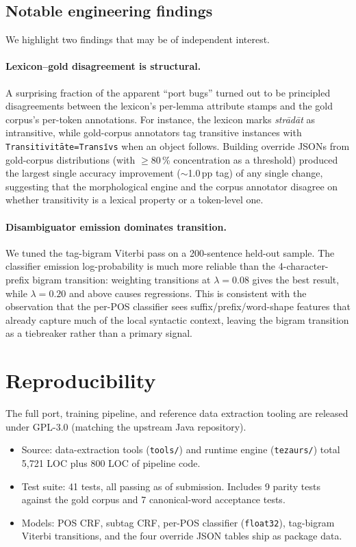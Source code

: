 \documentclass[11pt,a4paper]{article}
\begin{document}
\subsection{Notable engineering findings}

We highlight two findings that may be of independent interest.

\paragraph{Lexicon--gold disagreement is structural.} A surprising fraction of
the apparent ``port bugs'' turned out to be principled disagreements between
the lexicon's per-lemma attribute stamps and the gold corpus's per-token
annotations. For instance, the lexicon marks \textit{strādāt} as
intransitive, while gold-corpus annotators tag transitive instances with
\texttt{Transitivit\=ate=Trans\=\i vs} when an object follows. Building override
JSONs from gold-corpus distributions (with $\geq$80\,\% concentration as a
threshold) produced the largest single accuracy improvement
($\sim$1.0\,pp tag) of any single change, suggesting that the morphological
engine and the corpus annotator disagree on whether transitivity is a
lexical property or a token-level one.

\paragraph{Disambiguator emission dominates transition.} We tuned the
tag-bigram Viterbi pass on a 200-sentence held-out sample. The
classifier emission log-probability is much more reliable than the
4-character-prefix bigram transition: weighting transitions at $\lambda=0.08$
gives the best result, while $\lambda=0.20$ and above causes regressions.
This is consistent with the observation that the per-POS classifier sees
suffix/prefix/word-shape features that already capture much of the local
syntactic context, leaving the bigram transition as a tiebreaker rather than
a primary signal.

\section{Reproducibility}

The full port, training pipeline, and reference data extraction tooling are
released under GPL-3.0 (matching the upstream Java repository).
\begin{itemize}
\item Source: data-extraction tools (\texttt{tools/}) and runtime engine
  (\texttt{tezaurs/}) total 5{,}721 LOC plus 800 LOC of pipeline code.
\item Test suite: 41 tests, all passing as of submission. Includes 9
  parity tests against the gold corpus and 7 canonical-word acceptance tests.
\item Models: POS CRF, subtag CRF, per-POS classifier (\texttt{float32}),
  tag-bigram Viterbi transitions, and the four override JSON tables ship as
  package data.
\end{itemize}
\end{document}
